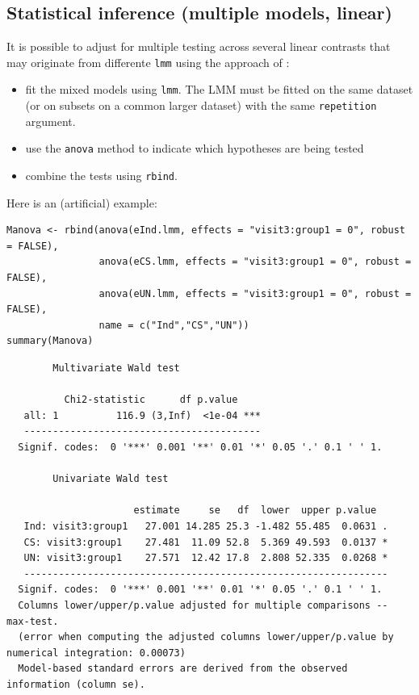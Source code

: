 \documentclass[12pt]{article}
\begin{document}
\clearpage

\subsection{Statistical inference (multiple models, linear)}
\label{sec:org0b14350}

It is possible to adjust for multiple testing across several linear
contrasts that may originate from differente \texttt{lmm} using the approach
of \cite{pipper2012versatile}:
\begin{itemize}
\item fit the mixed models using \texttt{lmm}. The LMM must be fitted on the same
dataset (or on subsets on a common larger dataset) with the same \texttt{repetition} argument.
\item use the \texttt{anova} method to indicate which hypotheses are being tested
\item combine the tests using \texttt{rbind}.
\end{itemize}

Here is an (artificial) example:
\lstset{language=r,label= ,caption= ,captionpos=b,numbers=none}
\begin{lstlisting}
Manova <- rbind(anova(eInd.lmm, effects = "visit3:group1 = 0", robust = FALSE),
                anova(eCS.lmm, effects = "visit3:group1 = 0", robust = FALSE),
                anova(eUN.lmm, effects = "visit3:group1 = 0", robust = FALSE),
                name = c("Ind","CS","UN"))
summary(Manova) 
\end{lstlisting}

\begin{verbatim}
		Multivariate Wald test 

          Chi2-statistic      df p.value    
   all: 1          116.9 (3,Inf)  <1e-04 ***
   ----------------------------------------- 
  Signif. codes:  0 '***' 0.001 '**' 0.01 '*' 0.05 '.' 0.1 ' ' 1.

		Univariate Wald test 

                      estimate     se   df  lower  upper p.value  
   Ind: visit3:group1   27.001 14.285 25.3 -1.482 55.485  0.0631 .
   CS: visit3:group1    27.481  11.09 52.8  5.369 49.593  0.0137 *
   UN: visit3:group1    27.571  12.42 17.8  2.808 52.335  0.0268 *
   --------------------------------------------------------------- 
  Signif. codes:  0 '***' 0.001 '**' 0.01 '*' 0.05 '.' 0.1 ' ' 1.
  Columns lower/upper/p.value adjusted for multiple comparisons -- max-test.
  (error when computing the adjusted columns lower/upper/p.value by numerical integration: 0.00073)
  Model-based standard errors are derived from the observed information (column se).
\end{verbatim}
\end{document}
